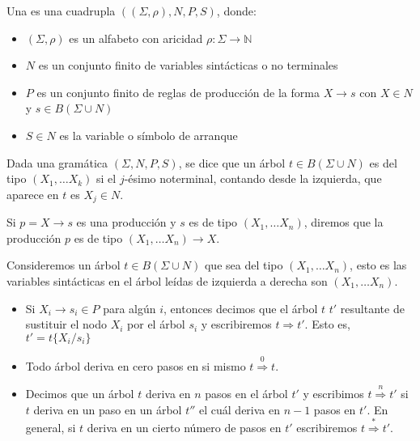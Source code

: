 \begin{definition}
Una  es una cuadrupla $((\Sigma, \rho), N, P, S)$, 
donde:
\begin{itemize}
\item
$(\Sigma, \rho)$ es un alfabeto con aricidad $\rho: \Sigma \rightarrow \mathds{N}$
\item
$N$ es un conjunto finito de variables sintácticas o no terminales
\item
$P$ es un conjunto finito de reglas de producción de la forma
$X \rightarrow s$ con $X \in N$ y $s \in B(\Sigma \cup N)$
\item
$S \in N$ es la variable o símbolo de arranque
\end{itemize}


\end{definition}


\begin{definition}
Dada una gramática $(\Sigma, N, P, S)$,
se dice que un árbol $t \in B(\Sigma \cup N)$ es del tipo $(X_1, \ldots X_k)$
si el $j$-ésimo noterminal, contando desde la izquierda, que aparece en $t$
es $X_j \in N$. 

Si $p = X \rightarrow s$ es una producción y $s$ es de tipo $(X_1, \ldots X_n)$,
diremos que la producción $p$ es de tipo $(X_1, \ldots X_n) \rightarrow X$.
\end{definition}

\begin{definition}
Consideremos un árbol  $t \in B(\Sigma \cup N)$
que sea del tipo $(X_1, \ldots X_n)$, esto es las variables sintácticas
en el árbol leídas de izquierda a derecha son $(X_1, \ldots X_n)$.

\begin{itemize}
\item
Si $X_i \rightarrow s_i \in P$ para algún $i$, entonces 
decimos que el árbol $t$ 
$t'$ resultante de sustituir el nodo $X_i$ por el árbol $s_i$ y escribiremos
$t \Longrightarrow t'$.  Esto es, $t' = t\{X_i/s_i\}$
\item
Todo árbol deriva en cero pasos
en si mismo $t \stackrel{0}{\Longrightarrow} t$. 
\item
Decimos que un árbol $t$ deriva en $n$ pasos en el árbol $t'$
y escribimos $t \stackrel{n}{\Longrightarrow} t'$
si $t$ deriva en un paso en un árbol $t''$ el cuál deriva en $n-1$ pasos en $t'$.
En general, si $t$ deriva en un cierto número de pasos en $t'$ escribiremos
$t \stackrel{*}{\Longrightarrow} t'$.
\end{itemize}
\end{definition}

